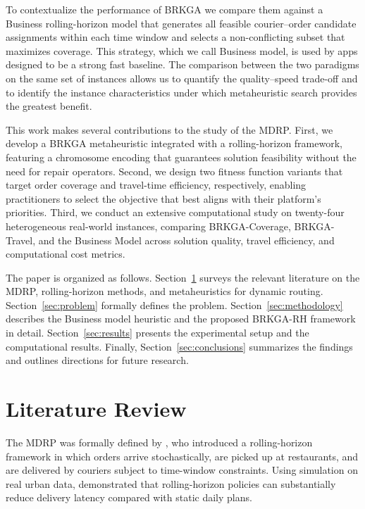 \documentclass[runningheads]{llncs}
\begin{document}
To contextualize the performance of BRKGA we compare them against a Business rolling-horizon model that generates all feasible courier--order candidate assignments within each time window and selects a non-conflicting subset that maximizes coverage. This strategy, which we call Business model, is used by apps designed to be a strong fast baseline. The comparison between the two paradigms on the same set of instances allows us to quantify the quality--speed trade-off and to identify the instance characteristics under which metaheuristic search provides the greatest benefit. 

This work makes several contributions to the study of the MDRP. First, we develop a BRKGA metaheuristic integrated with a rolling-horizon framework, featuring a chromosome encoding that guarantees solution feasibility without the need for repair operators. Second, we design two fitness function variants that target order coverage and travel-time efficiency, respectively, enabling practitioners to select the objective that best aligns with their platform's priorities. Third, we conduct an extensive computational study on twenty-four heterogeneous real-world instances, comparing BRKGA-Coverage, BRKGA-Travel, and the Business Model across solution quality, travel efficiency, and computational cost metrics. 

The paper is organized as follows. Section~\ref{sec:litreview} surveys the relevant literature on the MDRP, rolling-horizon methods, and metaheuristics for
dynamic routing. Section~\ref{sec:problem} formally defines the problem.
Section~\ref{sec:methodology} describes the Business model heuristic
and the proposed BRKGA-RH framework in detail.
Section~\ref{sec:results} presents the experimental setup
and the computational results.
Finally, Section~\ref{sec:conclusions} summarizes the findings
and outlines directions for future research.


\section{Literature Review}\label{sec:litreview}



The MDRP was formally defined by \cite{ref-reyes2018}, who introduced a rolling-horizon framework in which orders arrive
stochastically, are picked up at restaurants, and are delivered by couriers subject to time-window constraints. Using simulation on real urban data, demonstrated that rolling-horizon policies can substantially reduce delivery latency compared with static daily plans.
\end{document}
